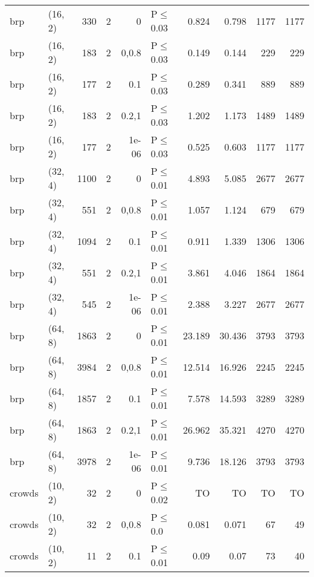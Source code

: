 \begin{longtable}{llrrrlrrrr}
 brp           & (16, 2)  &    	330 &   2 & 0     & P$\leq$0.03  & 0.824   & 0.798   & 1177    & 1177 \\
 brp           & (16, 2)  &    	183 &   2 & 0,0.8 & P$\leq$0.03  & 0.149   & 0.144   & 229     & 229  \\
 brp           & (16, 2)  &    	177 &   2 & 0.1   & P$\leq$0.03  & 0.289   & 0.341   & 889     & 889  \\
 brp           & (16, 2)  &    	183 &   2 & 0.2,1 & P$\leq$0.03  & 1.202   & 1.173   & 1489    & 1489 \\
 brp           & (16, 2)  &    	177 &   2 & 1e-06 & P$\leq$0.03  & 0.525   & 0.603   & 1177    & 1177 \\
 brp           & (32, 4)  &   	1100 &   2 & 0     & P$\leq$0.01  & 4.893   & 5.085   & 2677    & 2677 \\
 brp           & (32, 4)  &    	551 &   2 & 0,0.8 & P$\leq$0.01  & 1.057   & 1.124   & 679     & 679  \\
 brp           & (32, 4)  &   	1094 &   2 & 0.1   & P$\leq$0.01  & 0.911   & 1.339   & 1306    & 1306 \\
 brp           & (32, 4)  &    	551 &   2 & 0.2,1 & P$\leq$0.01  & 3.861   & 4.046   & 1864    & 1864 \\
 brp           & (32, 4)  &    	545 &   2 & 1e-06 & P$\leq$0.01  & 2.388   & 3.227   & 2677    & 2677 \\
 brp           & (64, 8)  &   	1863 &   2 & 0     & P$\leq$0.01  & 23.189  & 30.436  & 3793    & 3793 \\
 brp           & (64, 8)  &   	3984 &   2 & 0,0.8 & P$\leq$0.01  & 12.514  & 16.926  & 2245    & 2245 \\
 brp           & (64, 8)  &   	1857 &   2 & 0.1   & P$\leq$0.01  & 7.578   & 14.593  & 3289    & 3289 \\
 brp           & (64, 8)  &   	1863 &   2 & 0.2,1 & P$\leq$0.01  & 26.962  & 35.321  & 4270    & 4270 \\
 brp           & (64, 8)  &   	3978 &   2 & 1e-06 & P$\leq$0.01  & 9.736   & 18.126  & 3793    & 3793 \\
 crowds        & (10, 2)  &     	32 &   2 & 0     & P$\leq$0.02  & TO      & TO      & TO      & TO   \\
 crowds        & (10, 2)  &     	32 &   2 & 0,0.8 & P$\leq$0.0   & 0.081   & 0.071   & 67      & 49   \\
 crowds        & (10, 2)  &     	11 &   2 & 0.1   & P$\leq$0.01  & 0.09    & 0.07    & 73      & 40   \\

\end{longtable}
